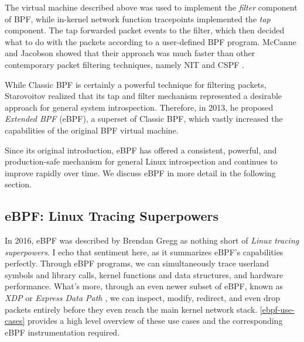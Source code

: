 \documentclass[
  12pt]{findlay}
\begin{document}
The virtual machine described above was used to implement the
\emph{filter} component of BPF, while in-kernel network function
tracepoints implemented the \emph{tap} component. The tap forwarded
packet events to the filter, which then decided what to do with the
packets according to a user-defined BPF program. McCanne and Jacobson
showed that their approach was much faster than other contemporary
packet filtering techniques, namely NIT \autocite{nit} and CSPF
\autocite{mogul87}.

While Classic BPF is certainly a powerful technique for filtering
packets, Starovoitov \autocite{starovoitov13,starovoitov14} realized
that its tap and filter mechanism represented a desirable approach for
general system introspection. Therefore, in 2013, he proposed
\emph{Extended BPF} (eBPF), a superset of Classic BPF, which vastly
increased the capabilities of the original BPF virtual machine.

Since its original introduction, eBPF has offered a consistent,
powerful, and production-safe mechanism for general Linux introspection
and continues to improve rapidly over time. We discuss eBPF in more
detail in the following section.

\hypertarget{ebpf-linux-tracing-superpowers}{%
\subsection{eBPF: Linux Tracing
Superpowers}\label{ebpf-linux-tracing-superpowers}}

\label{ebpf-superpowers}

In 2016, eBPF was described by Brendan Gregg \autocite{gregg16} as
nothing short of \emph{Linux tracing superpowers}. I echo that sentiment
here, as it summarizes eBPF's capabilities perfectly. Through eBPF
programs, we can simultaneously trace userland symbols and library
calls, kernel functions and data structures, and hardware performance.
What's more, through an even newer subset of eBPF, known as \emph{XDP}
or \emph{Express Data Path} \autocite{xdp}, we can inspect, modify,
redirect, and even drop packets entirely before they even reach the main
kernel network stack. \autoref{ebpf-use-cases} provides a high level
overview of these use cases and the corresponding eBPF instrumentation
required.
\end{document}
